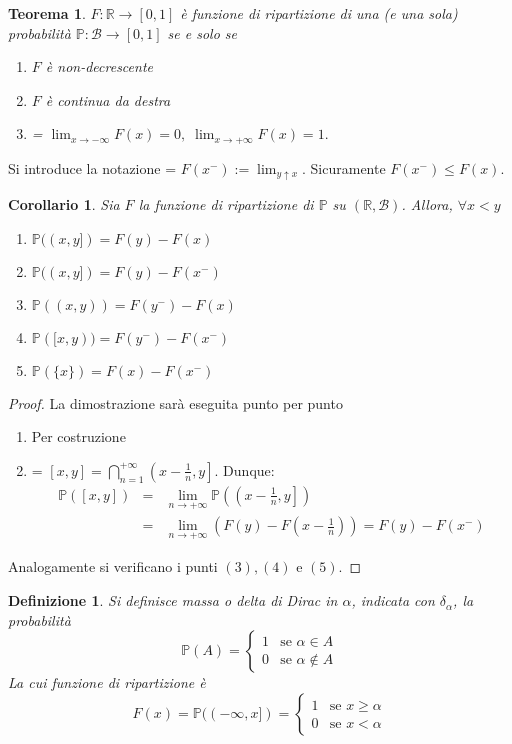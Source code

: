 \documentclass[a4paper,12pt]{article}
\theoremstyle{break}
\newtheorem{theorem}{Teorema}[section]
\newtheorem{corollary}{Corollario}[section]
\newtheorem{definition}{Definizione}[section]
\numberwithin{equation}{section}
\begin{document}
\begin{theorem}
  \(F:\mathbb{R} \to [0,1]\) è funzione di ripartizione di una (e una sola) probabilità \(\mathbb{P}:\mathcal{B} \to [0,1]\) se e solo se
  \begin{enumerate}
    \item \(F\) è non-decrescente
    \item \(F\) è continua da destra
    \item {\everymath = {\displaystyle}\(\lim_{x \to -\infty} F(x) = 0, \; \lim_{x \to +\infty}F(x) = 1.\)}
  \end{enumerate}
\end{theorem}
Si introduce la notazione {\everymath = {\displaystyle}\(F(x^-) := \lim_{y \uparrow x}\)}. Sicuramente \(F(x^-) \leq F(x)\).
\begin{corollary}
  Sia \(F\) la funzione di ripartizione di \(\mathbb{P}\) su \((\mathbb{R}, \mathcal{B})\). Allora, \(\forall x < y\)
  \begin{enumerate}
    \item \(\mathbb{P}((x, y]) = F(y) - F(x)\)
    \item \(\mathbb{P}((x, y]) = F(y) - F(x^-)\)
    \item \(\mathbb{P}((x, y)) = F(y^-) - F(x)\)
    \item \(\mathbb{P}([x, y)) = F(y^-) - F(x^-)\)
    \item \(\mathbb{P}(\{x\}) = F(x) - F(x^-)\)
  \end{enumerate}
\end{corollary}
\begin{proof}
  La dimostrazione sarà eseguita punto per punto
  \begin{enumerate}
    \item Per costruzione
    \item {\everymath = {\displaystyle}\([x, y] = \bigcap_{n=1}^{+\infty} \left(x - \frac{1}{n}, y\right]\)}. Dunque:
    \[
    \begin{array}{lll}
    \mathbb{P}([x, y]) & = & \lim_{n \to +\infty} \mathbb{P}\left(\left(x - \frac{1}{n}, y\right]\right) \\
    & = & \lim_{n \to +\infty}\left(F(y) - F\left(x-\frac{1}{n}\right)\right) = F(y) - F(x^-)
    \end{array}
    \]
  \end{enumerate}
Analogamente si verificano i punti \((3), (4) \mbox{ e } (5).\)
\end{proof}
\begin{definition}
  Si definisce massa o delta di Dirac in \(\alpha\), indicata con \(\delta_{\alpha}\), la probabilità
  \[
    \mathbb{P}(A) = \begin{cases}
      1 & \mbox{se } \alpha \in A \\
      0 & \mbox{se } \alpha \not \in A
    \end{cases}
  \]
  La cui funzione di ripartizione è 
  \[
    F(x) = \mathbb{P}((-\infty, x]) = \begin{cases}
      1 & \mbox{se } x \geq \alpha \\
      0 & \mbox{se } x < \alpha
    \end{cases}
  \]
\end{definition}
\end{document}
